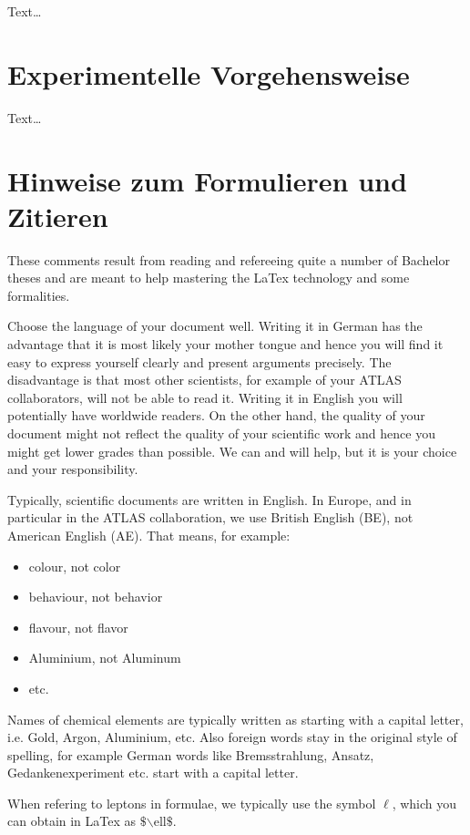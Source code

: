 \documentclass[bachelor,       %
               twoside,        %
               BCOR10mm,       %
               ngerman,english  %
               ]{GAUBM}
\begin{document}
Text\dots

\chapter{Experimentelle Vorgehensweise}
Text\dots

\chapter{Hinweise zum Formulieren und Zitieren}

%
%
These comments result from reading and refereeing quite a number of
Bachelor theses and are meant to help mastering the LaTex technology
and some formalities.

%
%
Choose the language of your document well. Writing it in German has
the advantage that it is most likely your mother tongue and hence you
will find it easy to express yourself clearly and present arguments
precisely. The disadvantage is that most other scientists, for example
of your ATLAS collaborators, will not be able to read it. Writing it
in English you will potentially have worldwide readers. On the other
hand, the quality of your document might not reflect the quality of
your scientific work and hence you might get lower grades than
possible. We can and will help, but it is your choice and your
responsibility.

%
%
Typically, scientific documents are written in English. In Europe, and
in particular in the ATLAS collaboration, we use British English (BE),
not American English (AE). That means, for example:
\begin{itemize}
\item colour, not color
\item behaviour, not behavior
\item flavour, not flavor
\item Aluminium, not Aluminum
\item etc.
\end{itemize}

Names of chemical elements are typically written as starting with a
capital letter, i.e. Gold, Argon, Aluminium, etc. Also foreign words
stay in the original style of spelling, for example German words like
Bremsstrahlung, Ansatz, Gedankenexperiment etc. start with a capital
letter.

When refering to leptons in formulae, we typically use the symbol
$\ell$, which you can obtain in LaTex as $\$${$\backslash$ell}$\$$.
\end{document}
